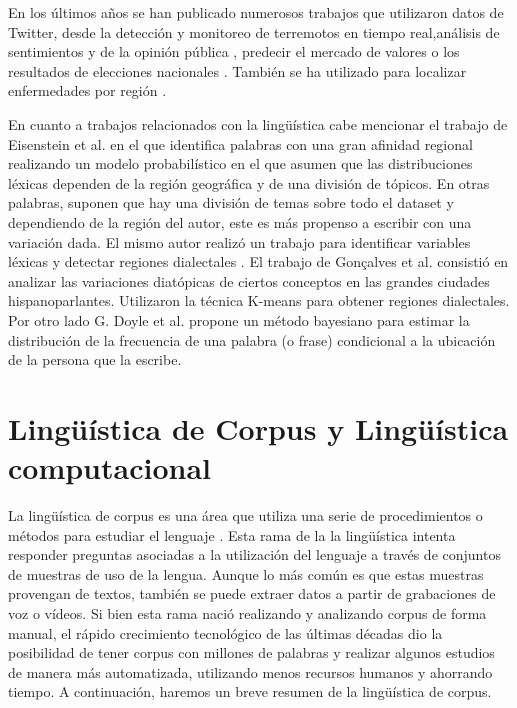 En los últimos años se han publicado numerosos trabajos que utilizaron datos de Twitter, desde la detección y monitoreo de terremotos en tiempo real\cite{sakaki2010earthquake},análisis de sentimientos y de la opinión pública \cite{liu2012sentiment},  predecir el mercado de valores \cite{pak2010twitter} o los resultados de elecciones nacionales \cite{tumasjan2010predicting}. También se ha utilizado para localizar enfermedades por región \cite{paul2011you}.

En cuanto a trabajos relacionados con la lingüística cabe mencionar el trabajo de Eisenstein et al. \cite{eisenstein2010latent} en el que identifica palabras con una gran afinidad regional realizando un modelo probabilístico en el que asumen que las distribuciones léxicas dependen de la región geográfica y de una división de tópicos. En otras palabras, suponen que hay una división de temas sobre todo el dataset y dependiendo de la región del autor, este es más propenso a escribir con una variación dada. El mismo autor realizó un trabajo para identificar variables léxicas y detectar regiones dialectales \cite{eisenstein2014identifying}.
El trabajo de Gonçalves et al. \cite{gonccalves2014crowdsourcing} consistió en analizar las variaciones diatópicas de ciertos conceptos en las grandes ciudades hispanoparlantes. Utilizaron la técnica K-means \cite{bishop2006pattern} para obtener regiones dialectales. Por otro lado G. Doyle et al. \cite{doyle2014mapping} propone un método bayesiano para estimar la distribución de la frecuencia de una palabra (o frase) condicional a la ubicación de la persona que la escribe. 


\section{Lingüística de Corpus y Lingüística computacional} %
\label{linguistica_computacional}

La lingüística de corpus es una área que utiliza una serie de procedimientos o métodos para estudiar el lenguaje \cite{mcenery2011corpus}. Esta rama de la la lingüística intenta responder 
preguntas asociadas a la utilización del lenguaje a través de conjuntos de muestras de uso de la lengua. Aunque lo más común es que estas muestras provengan de textos, también se puede extraer datos a partir de grabaciones de voz o vídeos. Si bien esta rama nació realizando y analizando corpus de forma manual, el rápido crecimiento
tecnológico de las últimas décadas dio la posibilidad de tener corpus con millones de palabras y realizar algunos estudios de manera más automatizada, utilizando menos recursos humanos y ahorrando tiempo. A continuación, haremos un breve resumen de la lingüística de corpus.

